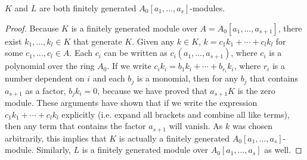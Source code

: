 \begin{lemma}
\label{KLfg}
$K$ and $L$ are both finitely generated $A_0[a_1,\ldots,a_{s}]$-modules.
\end{lemma}
\begin{proof}
Because $K$ is a finitely generated module over $A=A_0[a_1,\ldots,a_{s+1}]$, there exist $k_1,\ldots,k_l\in{K}$ that generate $K$. Given any $k\in{K}$, $k=c_1{k_1}+\cdots+c_l{k_l}$ for some $c_1,\ldots,c_l\in{A}$. Each $c_i$ can be written as $c_i(a_1,\ldots,a_{s+1})$, where $c_i$ is a polynomial over the ring $A_0$. If we write $c_i{k_i}=b_1{k_i}+\cdots+b_{r_i}{k_i}$, where $r_i$ is a number dependent on $i$ and each $b_j$ is a monomial, then for any $b_j$ that contains $a_{s+1}$ as a factor, $b_j{k_i}=0$, because we have proved that $a_{s+1}{K}$ is the zero module. These arguments have shown that if we write the expression $c_1{k_1}+\cdots+c_l{k_l}$ explicitly (i.e. expand all brackets and combine all like terms), then any term that contains the factor $a_{s+1}$ will vanish. As $k$ was chosen arbitrarily, this implies that $K$ is actually a finitely generated ${A_0}[a_1,\ldots,a_{s}]$-module. Similarly, $L$ is a finitely generated module over ${A_0}[a_1,\ldots,a_{s}]$ as well.
\end{proof}

